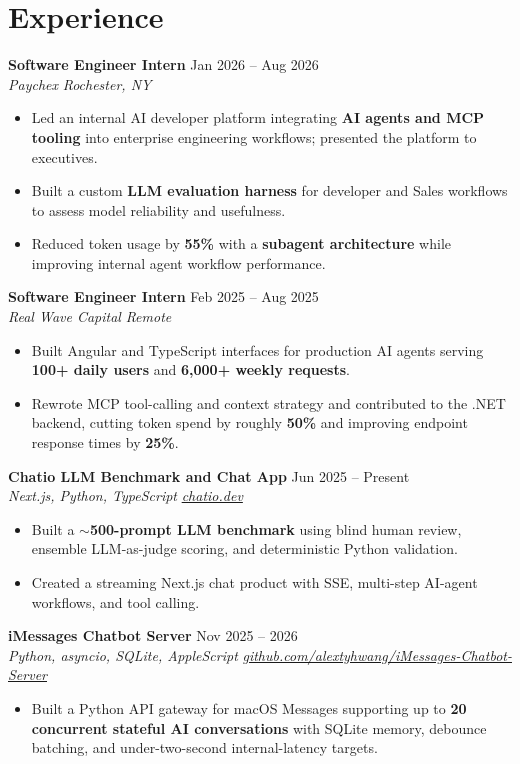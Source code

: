 \documentclass[10pt,letterpaper]{article}
\newif\ifresumeFirstRole
\newcommand{\resumeRole}[4]{%
  \ifresumeFirstRole
    \global\resumeFirstRolefalse
  \else
    \vspace{0pt plus 1fill}%
  \fi
  \textbf{#1} \hfill #2\\
  \textit{#3} \hfill \textit{#4}
}
\begin{document}
\section*{Experience}
\resumeRole{Software Engineer Intern}{Jan 2026 -- Aug 2026}{Paychex}{Rochester, NY}
\begin{itemize}
  \item Led an internal AI developer platform integrating \textbf{AI agents and MCP tooling} into enterprise engineering workflows; presented the platform to executives.
  \item Built a custom \textbf{LLM evaluation harness} for developer and Sales workflows to assess model reliability and usefulness.
  \item Reduced token usage by \textbf{55\%} with a \textbf{subagent architecture} while improving internal agent workflow performance.
\end{itemize}

\resumeRole{Software Engineer Intern}{Feb 2025 -- Aug 2025}{Real Wave Capital}{Remote}
\begin{itemize}
  \item Built Angular and TypeScript interfaces for production AI agents serving \textbf{100+ daily users} and \textbf{6,000+ weekly requests}.
  \item Rewrote MCP tool-calling and context strategy and contributed to the .NET backend, cutting token spend by roughly \textbf{50\%} and improving endpoint response times by \textbf{25\%}.
\end{itemize}

\resumeRole{Chatio LLM Benchmark and Chat App}{Jun 2025 -- Present}{Next.js, Python, TypeScript}{\href{https://chatio.dev}{chatio.dev}}
\begin{itemize}
  \item Built a \textbf{${\sim}$500-prompt LLM benchmark} using blind human review, ensemble LLM-as-judge scoring, and deterministic Python validation.
  \item Created a streaming Next.js chat product with SSE, multi-step AI-agent workflows, and tool calling.
\end{itemize}

\resumeRole{iMessages Chatbot Server}{Nov 2025 -- 2026}{Python, asyncio, SQLite, AppleScript}{\href{https://github.com/alextyhwang/iMessages-Chatbot-Server}{github.com/alextyhwang/iMessages-Chatbot-Server}}
\begin{itemize}
  \item Built a Python API gateway for macOS Messages supporting up to \textbf{20 concurrent stateful AI conversations} with SQLite memory, debounce batching, and under-two-second internal-latency targets.
\end{itemize}
\end{document}
